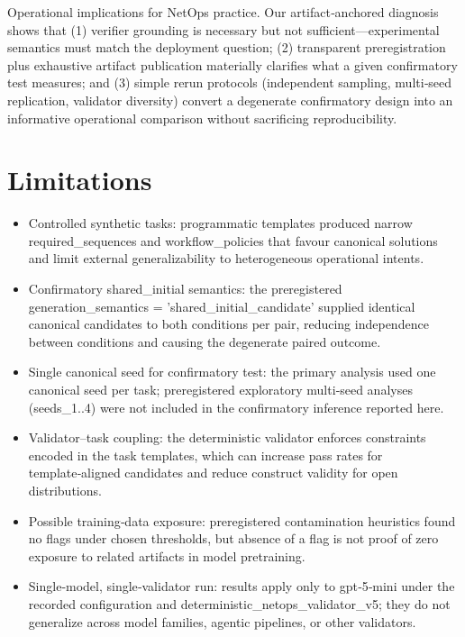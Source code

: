 \documentclass[conference]{IEEEtran}
\begin{document}
Operational implications for NetOps practice. Our artifact‑anchored diagnosis shows that (1) verifier grounding is necessary but not sufficient---experimental semantics must match the deployment question; (2) transparent preregistration plus exhaustive artifact publication materially clarifies what a given confirmatory test measures; and (3) simple rerun protocols (independent sampling, multi‑seed replication, validator diversity) convert a degenerate confirmatory design into an informative operational comparison without sacrificing reproducibility.

\section{Limitations}
\begin{itemize}
\item Controlled synthetic tasks: programmatic templates produced narrow required\_sequences and workflow\_policies that favour canonical solutions and limit external generalizability to heterogeneous operational intents.
\item Confirmatory shared\_initial semantics: the preregistered generation\_semantics = 'shared\_initial\_candidate' supplied identical canonical candidates to both conditions per pair, reducing independence between conditions and causing the degenerate paired outcome.
\item Single canonical seed for confirmatory test: the primary analysis used one canonical seed per task; preregistered exploratory multi‑seed analyses (seeds\_1..4) were not included in the confirmatory inference reported here.
\item Validator--task coupling: the deterministic validator enforces constraints encoded in the task templates, which can increase pass rates for template‑aligned candidates and reduce construct validity for open distributions.
\item Possible training‑data exposure: preregistered contamination heuristics found no flags under chosen thresholds, but absence of a flag is not proof of zero exposure to related artifacts in model pretraining.
\item Single‑model, single‑validator run: results apply only to gpt‑5‑mini under the recorded configuration and deterministic\_netops\_validator\_v5; they do not generalize across model families, agentic pipelines, or other validators.
\end{itemize}
\end{document}
